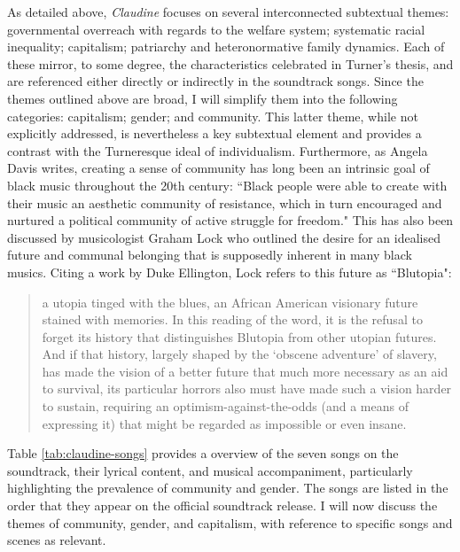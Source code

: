 



As detailed above, \textit{Claudine} focuses on several interconnected subtextual themes: governmental overreach with regards to the welfare system; systematic racial inequality; capitalism; patriarchy and heteronormative family dynamics.
Each of these mirror, to some degree, the characteristics celebrated in Turner's thesis, and are referenced either directly or indirectly in the soundtrack songs.
Since the themes outlined above are broad, I will simplify them into the following categories:
capitalism; gender; and community.
This latter theme, while not explicitly addressed, is nevertheless a key subtextual element and provides a contrast with the Turneresque ideal of individualism.
Furthermore, as Angela Davis writes, creating a sense of community has long been an intrinsic goal of black music throughout the 20th century: ``Black people were able to create with their music an aesthetic community of resistance, which in turn encouraged and nurtured a political community of active struggle for freedom."\autocite[][201]{davis_women_1989}
This has also been discussed by musicologist Graham Lock who outlined the desire for an idealised future and communal belonging that is supposedly inherent in many black musics.
Citing a work by Duke Ellington, Lock refers to this future as ``Blutopia":
\begin{quote}
a utopia tinged with the blues, an African American visionary future stained with memories. In this reading of the word, it is the refusal to forget its history that distinguishes Blutopia from other utopian futures. And if that history, largely shaped by the `obscene adventure' of slavery, has made the vision of a better future that much more necessary as an aid to survival, its particular horrors also must have made such a vision harder to sustain, requiring an optimism-against-the-odds (and a means of expressing it) that might be regarded as impossible or even insane.\autocite[][3]{lock_blutopia_2000}
\end{quote}

Table \ref{tab:claudine-songs} provides a overview of the seven songs on the soundtrack, their lyrical content, and musical accompaniment, particularly highlighting the prevalence of community and gender.
The songs are listed in the order that they appear on the official soundtrack release.
I will now discuss the themes of community, gender, and capitalism, with reference to specific songs and scenes as relevant.



